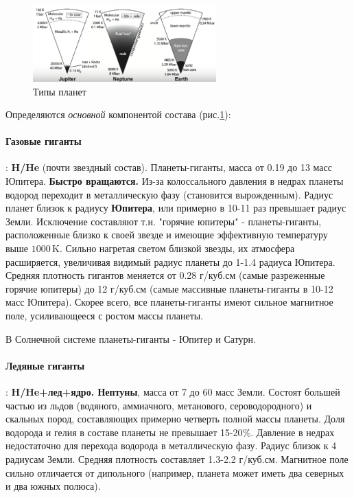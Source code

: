 \begin{figure}
  \begin{center}
    \includegraphics[width=0.63\textwidth]{Pictures/4_solar_types.png}
  \end{center}
  \caption{Типы планет}
  \label{fig:4_solar_types}
\end{figure}

Определяются \textit{основной} компонентой состава (рис.\ref{fig:4_solar_types}):

\paragraph{Газовые гиганты}: \textbf{H/He} (почти звездный состав). Планеты-гиганты, масса от 0.19 до 13 масс Юпитера. \textbf{Быстро вращаются.} Из-за колоссального давления в недрах планеты водород переходит в металлическую фазу (становится вырожденным). Радиус планет близок к радиусу \textbf{Юпитера}, или примерно в 10-11 раз превышает радиус Земли. Исключение составляют т.н. "горячие юпитеры" - планеты-гиганты, расположенные близко к своей звезде и имеющие эффективную температуру выше $1000\,\text{K}$. Сильно нагретая светом близкой звезды, их атмосфера расширяется, увеличивая видимый радиус планеты до 1-1.4 радиуса Юпитера. Средняя плотность гигантов меняется от 0.28 г/куб.см (самые разреженные горячие юпитеры) до 12 г/куб.см (самые массивные планеты-гиганты в 10-12 масс Юпитера). Скорее всего, все планеты-гиганты имеют сильное магнитное поле, усиливающееся с ростом массы планеты.

В Солнечной системе планеты-гиганты - Юпитер и Сатурн. 


\paragraph{Ледяные гиганты}: \textbf{H/He+лед+ядро. Нептуны}, масса от 7 до 60 масс Земли. Состоят большей частью из льдов (водяного, аммиачного, метанового, сероводородного) и скальных пород, составляющих примерно четверть полной массы планеты. Доля водорода и гелия в составе планеты не превышает 15-20$\%$. Давление в недрах недостаточно для перехода водорода в металлическую фазу. Радиус близок к 4 радиусам Земли. Средняя плотность составляет 1.3-2.2 г/куб.см. Магнитное поле сильно отличается от дипольного (например, планета может иметь два северных и два южных полюса).

